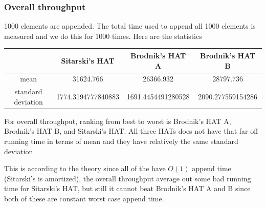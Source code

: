 \documentclass{article} %
\begin{document}
    \subsubsection*{Overall throughput}
    1000 elements are appended. The total time used to append all 1000 elements is measured and we do this for 1000 times.
    Here are the statistics
    \begin{center}
        \begin{tabular}{|c|c|c|c|}\hline
        & Sitarski's HAT & Brodnik's HAT A & Brodnik's HAT B\\\hline
        mean &  31624.766 & 26366.932 & 28797.736\\\hline
        standard deviation & 1774.3194777840883  & 1691.4454491280528 & 2090.277559154286\\\hline
        \end{tabular}
    \end{center}
    For overall throughput, ranking from best to worst is Brodnik's HAT A, Brodnik's HAT B, and Sitarski's HAT.
    All three HATs does not have that far off running time in terms of mean and they have relatively the same standard deviation.

    This is according to the theory since all of the have $O(1)$ append time (Sitarski's is amortized), the overall throughput
    average out some bad running time for Sitarski's HAT, but still it cannot beat Brodnik's HAT A and B since both of these are constant worst case append time.
\end{document}

